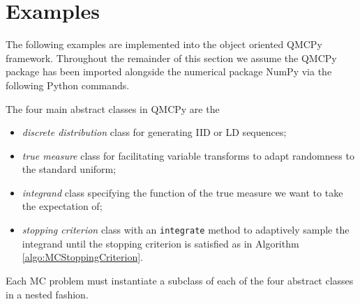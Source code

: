 \documentclass[graybox]{svmult}
\begin{document}
\section{Examples} \label{sec:examples}

The following examples are implemented into the object oriented QMCPy framework. Throughout the remainder of this section we assume the QMCPy package \cite{QMCPy} has been imported alongside the numerical package NumPy \cite{numpy} via the following Python commands. 

The four main abstract classes in QMCPy are the 
\begin{itemize}
    \item \emph{discrete distribution} class for generating IID or LD sequences;
    \item \emph{true measure} class for facilitating variable transforms to adapt randomness to the standard uniform;
    \item \emph{integrand} class specifying the function of the true measure we want to take the expectation of; 
    \item \emph{stopping criterion} class with an \texttt{integrate} method to adaptively sample the integrand until the stopping criterion is satisfied as in Algorithm \ref{algo:MCStoppingCriterion}.
\end{itemize}
Each MC problem must instantiate a subclass of each of the four abstract classes in a nested fashion. 
\end{document}
